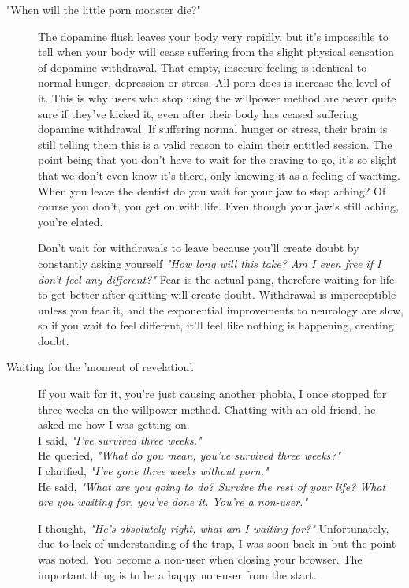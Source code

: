 \documentclass[easypeasy.tex]{subfiles}
\begin{document}
\begin{description}
\begin{description}
      \item["When will the little porn monster die?"]
        The dopamine flush leaves your body very rapidly, but it's impossible to tell when your body will cease suffering from the slight physical sensation of dopamine withdrawal. That empty, insecure feeling is identical to normal hunger, depression or stress. All porn does is increase the level of it. This is why users who stop using the willpower method are never quite sure if they've kicked it, even after their body has ceased suffering dopamine withdrawal. If suffering normal hunger or stress, their brain is still telling them this is a valid reason to claim their entitled session. The point being that you don't have to wait for the craving to go, it's so slight that we don't even know it's there, only knowing it as a feeling of wanting. When you leave the dentist do you wait for your jaw to stop aching? Of course you don't, you get on with life. Even though your jaw's still aching, you're elated.

        Don't wait for withdrawals to leave because you'll create doubt by constantly asking yourself \textit{"How long will this take? Am I even free if I don't feel any different?"} Fear is the actual pang, therefore waiting for life to get better after quitting will create doubt. Withdrawal is imperceptible unless you fear it, and the exponential improvements to neurology are slow, so if you wait to feel different, it'll feel like nothing is happening, creating doubt.

      \item [Waiting for the 'moment of revelation'.] If you wait for it, you're just causing another phobia, I once stopped for three weeks on the willpower method. Chatting with an old friend, he asked me how I was getting on. \\
        I said, \textit{"I've survived three weeks."} \\
        He queried, \textit{"What do you mean, you've survived three weeks?"} \\
        I clarified, \textit{"I've gone three weeks without porn."} \\
        He said, \textit{"What are you going to do? Survive the rest of your life? What are you waiting for, you've done it. You're a non-user."}

        I thought, \textit{"He's absolutely right, what am I waiting for?"} Unfortunately, due to lack of understanding of the trap, I was soon back in but the point was noted. You become a non-user when closing your browser. The important thing is to be a happy non-user from the start.


\end{description}
\end{description}
\end{document}
